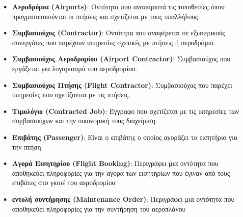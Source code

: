 \documentclass{article}
\begin{document}
\begin{itemize}
    \item \textbf{Αεροδρόμια (Airports)}: Οντότητα που αναπαριστά τις τοποθεσίες όπου πραγματοποιούνται οι πτήσεις και σχετίζεται με τους υπαλλήλους.
    \item \textbf{Συμβασιούχος (Contractor)}: Οντότητα που αναφέρεται σε εξωτερικούς συνεργάτες που παρέχουν υπηρεσίες σχετικές με πτήσεις ή αεροδρόμια.
    \item \textbf{Συμβασιούχος Αεροδρομίου (Airport Contractor)}: Συμβασιούχος που εργάζεται για λογαριασμό του αεροδρομίου.
    \item \textbf{Συμβασιούχος Πτήσης (Flight Contractor)}: Συμβασιούχος που παρέχει υπηρεσίες που σχετίζονται με τις πτήσεις.
    \item \textbf{Τιμολόγιο (Contracted Job)}: Έγγραφο που σχετίζεται με τις υπηρεσίες των συμβασιούχων και την οικονομική τους διαχείριση.
    \item \textbf{Επιβάτης (Passenger)}: Είναι ο επιβάτης ο οποίος αγοράζει το εισητήριο για την πτήση
    \item \textbf{Αγορά Εισητηρίου (Flight Booking)}: Περιγράφει μια οντότητα που αποθηκεύει πληροφορίες για την αγορά των εισητηρίων που έγιναν από τους επιβάτες στο γκισέ του αεροδρομίου
    \item \textbf{εντολή συντήρησης (Maintenance Order)}: Περιγράφει μια οντότητα που αποθηκεύει πληροφορίες για την συντήρηση του αεροπλάνου
\end{itemize}
\end{document}

